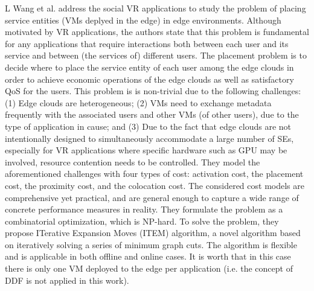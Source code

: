 \noindent\tab L Wang et al. \cite{wang2018service} address the social VR applications to study the problem of placing service entities (VMs deplyed in the edge) in edge environments. Although motivated by VR applications, the authors state that this problem is fundamental for any applications that require interactions both between each user and its service and between (the services of) different users. The placement problem is to decide where to place the service entity of each user among the edge clouds in order to achieve economic operations of the edge clouds as well as satisfactory QoS for the users. This problem is is non-trivial due to the following challenges: (1) Edge clouds are heterogeneous; (2) VMs need to exchange metadata frequently with the associated users and other VMs (of other users), due to the type of application in cause; and (3) Due to the fact that edge clouds are not intentionally designed to simultaneously accommodate a large number of SEs, especially for VR applications where specific hardware such as GPU may be involved, resource contention needs to be controlled. They model the aforementioned challenges with four types of cost: activation cost, the placement cost, the proximity cost, and the colocation cost. The considered cost models are comprehensive yet practical, and are general enough to capture a wide range of concrete performance measures in reality. They formulate the problem as a combinatorial optimization, which is NP-hard. To solve the problem, they propose ITerative Expansion Moves (ITEM) algorithm, a novel algorithm based on iteratively solving a series of minimum graph cuts. The algorithm is flexible and is applicable in both offline and online cases. It is worth that in this case there is only one VM deployed to the edge per application (i.e. the concept of DDF is not applied in this work).\\
